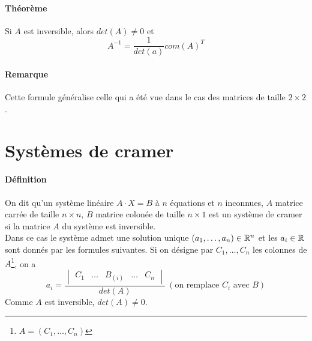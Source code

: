 \paragraph{Théorème} Si $A$ est inversible, alors $det(A) \neq 0$ et 
$$A^{-1} = \frac{1}{det(a)} com(A)^{T}$$

\paragraph{Remarque} Cette formule généralise celle qui a été vue dans le cas des matrices de taille $2 \times 2$.

%
%
\section{Systèmes de cramer}
%
%
\paragraph{Définition} On dit qu'un système linéaire $A \cdot X = B$ à $n$ équations et $n$ inconnues, $A$ matrice carrée de taille $n \times n$, $B$ matrice colonée de taille $n\times 1$ est un système de cramer si la matrice $A$ du système est inversible. \\
Dans ce cas le système admet une solution unique $(a_1, \ldots, a_n) \in \mathbb{R}^n$ et les $a_i \in \mathbb{R}$ sont donnés par les formules suivantes. Si on désigne par $C_1, \ldots, C_n$ les colonnes de $A$\footnote{$A = (C_1, \ldots, C_n)$}, on a
$$a_i = \frac{\begin{vmatrix} C_1 & \ldots & B_{(i)} & \ldots & C_n \end{vmatrix}}{det(A)} ~ (\text{on remplace } C_i \text{ avec } B)$$
Comme $A$ est inversible, $det(A) \neq 0$.

